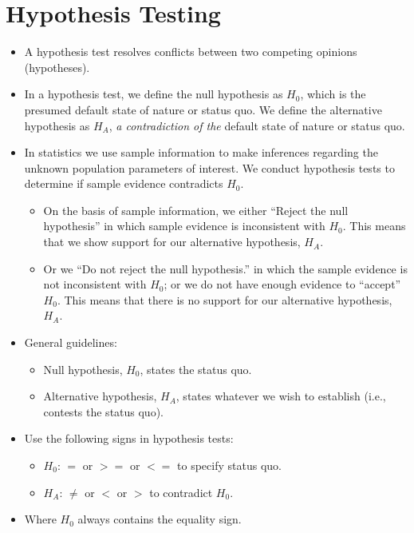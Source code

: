 \documentclass[
  letterpaper,
  DIV=11,
  numbers=noendperiod]{scrreprt}
\providecommand{\tightlist}{%
  \setlength{\itemsep}{0pt}\setlength{\parskip}{0pt}}\usepackage{longtable,booktabs,array}
\begin{document}
\section{Hypothesis Testing}\label{hypothesis-testing}

\begin{itemize}
\tightlist
\item
  A hypothesis test resolves conflicts between two competing opinions
  (hypotheses).
\item
  In a hypothesis test, we define the null hypothesis as \(H_0\), which
  is the presumed default state of nature or status quo. We define the
  alternative hypothesis as \(H_A\), \emph{a contradiction of the}
  default state of nature or status quo.
\item
  In statistics we use sample information to make inferences regarding
  the unknown population parameters of interest. We conduct hypothesis
  tests to determine if sample evidence contradicts \(H_0\).

  \begin{itemize}
  \tightlist
  \item
    On the basis of sample information, we either ``Reject the null
    hypothesis'' in which sample evidence is inconsistent with \(H_0\).
    This means that we show support for our alternative hypothesis,
    \(H_A\).
  \item
    Or we ``Do not reject the null hypothesis.'' in which the sample
    evidence is not inconsistent with \(H_0\); or we do not have enough
    evidence to ``accept'' \(H_0\). This means that there is no support
    for our alternative hypothesis, \(H_A\).
  \end{itemize}
\item
  General guidelines:

  \begin{itemize}
  \tightlist
  \item
    Null hypothesis, \(H_0\), states the status quo.
  \item
    Alternative hypothesis, \(H_A\), states whatever we wish to
    establish (i.e., contests the status quo).
  \end{itemize}
\item
  Use the following signs in hypothesis tests:

  \begin{itemize}
  \tightlist
  \item
    \(H_0\): \(=\) or \(>=\) or \(<=\) to specify status quo.
  \item
    \(H_A\): \(\neq\) or \(<\) or \(>\) to contradict \(H_0\).
  \end{itemize}
\item
  Where \(H_0\) always contains the equality sign.
\end{itemize}
\end{document}

